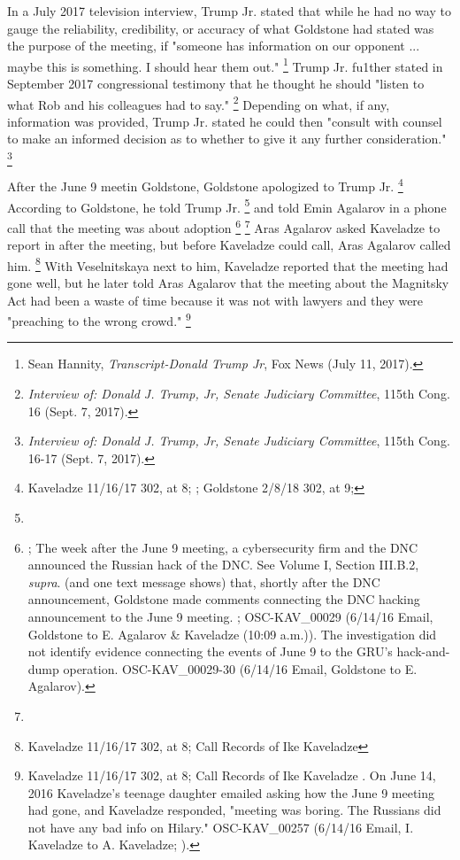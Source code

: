 In a July 2017 television interview, Trump Jr. stated that while he had no way to gauge the reliability, credibility, or accuracy of what Goldstone had stated was the purpose of the meeting, if "someone has information on our opponent ... maybe this is something.
I should hear them out."%
\footnote{Sean Hannity, \textit{Transcript-Donald Trump Jr}, Fox News (July 11, 2017).}
Trump Jr. fu1ther stated in September 2017 congressional testimony that he thought he should "listen to what Rob and his colleagues had to say."%
\footnote{\textit{Interview of: Donald J. Trump, Jr, Senate Judiciary Committee}, 115th Cong. 16 (Sept. 7, 2017).}
Depending on what, if any, information was provided, Trump Jr. stated he could then "consult with counsel to make an informed decision as to whether to give it any further consideration."%
\footnote{\textit{Interview of: Donald J. Trump, Jr, Senate Judiciary Committee}, 115th Cong. 16-17 (Sept. 7, 2017).}

After the June 9 meetin Goldstone, Goldstone apologized to Trump Jr.%
\footnote{Kaveladze 11/16/17 302, at 8; ; Goldstone 2/8/18 302, at 9; }
According to Goldstone, he told Trump Jr.
\footnote{}
and told Emin Agalarov in a phone call that the meeting was about adoption
\footnote{;
The week after the June 9 meeting, a cybersecurity firm and the DNC announced the Russian hack of the DNC.
See Volume I, Section III.B.2, \textit{supra}.
(and one text message shows) that, shortly after the DNC announcement, Goldstone made comments connecting the DNC hacking announcement to the June 9 meeting.
; OSC-KAV\_00029 (6/14/16 Email, Goldstone to E. Agalarov \& Kaveladze (10:09 a.m.)).
The investigation did not identify evidence connecting the events of June 9 to the GRU’s hack-and-dump operation.
OSC-KAV\_00029-30 (6/14/16 Email, Goldstone to E. Agalarov).}
\footnote{}
Aras Agalarov asked Kaveladze to report in after the meeting, but before Kaveladze could call, Aras Agalarov called him.%
\footnote{Kaveladze 11/16/17 302, at 8; Call Records of Ike Kaveladze }
With Veselnitskaya next to him, Kaveladze reported that the meeting had gone well, but he later told Aras Agalarov that the meeting about the Magnitsky Act had been a waste of time because it was not with lawyers and they were "preaching to the wrong crowd."%
\footnote{Kaveladze 11/16/17 302, at 8; Call Records of Ike Kaveladze .
On June 14, 2016 Kaveladze's teenage daughter emailed asking how the June 9 meeting had gone, and Kaveladze responded, "meeting was boring.
The Russians did not have any bad info on Hilary."
OSC-KAV\_00257 (6/14/16 Email, I. Kaveladze to A. Kaveladze; ).}

